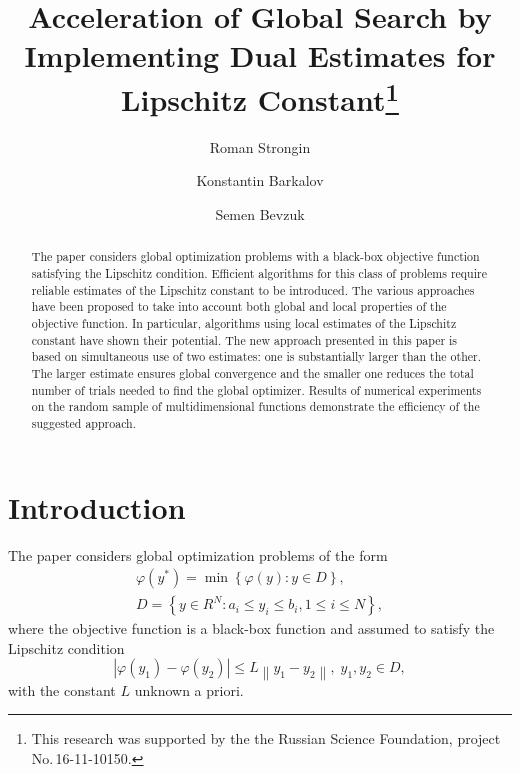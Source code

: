 \documentclass[runningheads]{llncs}
\begin{document}
%
\title{Acceleration of Global Search by Implementing Dual Estimates for Lipschitz Constant\thanks{This research was supported by the the Russian Science Foundation, project No.\,16-11-10150.}}
%
%
\author{Roman Strongin%
\and Konstantin Barkalov%
\and Semen Bevzuk%
}
%
%
%
\maketitle              %
%
\begin{abstract}
The paper considers global optimization problems with a black-box objective 
function satisfying the Lipschitz condition. Efficient algorithms for this 
class of problems require reliable estimates of the Lipschitz constant to be 
introduced. The various approaches have been proposed to take into account both
global and local properties of the objective function. In particular, algorithms
using local estimates of the Lipschitz constant have shown their potential.
The new approach presented in this paper is based on simultaneous use of two
estimates: one is substantially larger than the other. 
The larger estimate ensures global convergence and the smaller one reduces 
the total number of trials needed to find the global optimizer.
Results of numerical experiments on the random sample of multidimensional 
functions demonstrate the efficiency of the suggested approach.  

\end{abstract}
%
%
%
\section{Introduction}

The paper considers global optimization problems of the form 
\begin{gather}
 \varphi(y^\ast)=\min{\left\{\varphi(y):y\in D\right\}}, \label{problem}\\
 D=\left\{y\in R^N: a_i\leq y_i \leq b_i, 1\leq i \leq N\right\} \label{D},
\end{gather}
where the objective function is a black-box function and assumed to satisfy the Lipschitz condition
\[
\left|\varphi(y_1)-\varphi(y_2)\right|\leq L\left\|y_1-y_2\right\|,\; y_1,y_2 \in D,
\]
with the constant $L$ unknown a priori.
\end{document}
